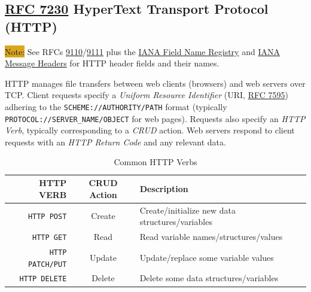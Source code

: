\documentclass[12pt]{article}
\newcommand{\note}[1]{\colorbox{#1}{Note:}}
\newcommand{\rfc}[1]{\href{https://datatracker.ietf.org/doc/html/rfc#1}{#1}}
\newcommand{\RFC}[1]{\href{https://datatracker.ietf.org/doc/html/rfc#1}{RFC #1}}
\begin{document}
	\subsection{\RFC{7230} HyperText Transport Protocol (HTTP) \label{subsec:HTTP}}
	\note{Goldenrod} See RFCs \rfc{9110}/\rfc{9111} plus the \href{https://www.iana.org/assignments/http-fields/http-fields.xhtml#field-names}{IANA Field Name Registry} and \href{https://www.iana.org/assignments/message-headers/message-headers.xml#perm-headers}{IANA Message Headers} for HTTP header fields and their names.

	HTTP manages file transfers between web clients (browsers) and web servers over TCP. Client requests specify a \textit{Uniform Resource Identifier} (URI, \RFC{7595}) adhering to the \texttt{SCHEME://AUTHORITY/PATH} format (typically \texttt{PROTOCOL://SERVER\_NAME/OBJECT} for web pages). Requests also specify an \textit{HTTP Verb}, typically corresponding to a \textit{CRUD} action. Web servers respond to client requests with an \textit{HTTP Return Code} and any relevant data.

	\begin{table}[H]
	\centering
	\caption{Common HTTP Verbs \label{tab:HTTP Verbs}}
	\begin{tabular}{r | c | l}
	\hline
	\textbf{HTTP VERB}		& \textbf{CRUD Action}	& \textbf{Description}\\\hline
	\texttt{HTTP POST}		& Create			& Create/initialize new data structures/variables\\\hline
	\texttt{HTTP GET}			& Read			& Read variable names/structures/values\\\hline
	\texttt{HTTP PATCH/PUT}	& Update			& Update/replace some variable values\\\hline
	\texttt{HTTP DELETE}		& Delete			& Delete some data structures/variables\\\hline
	\end{tabular}\end{table}
\end{document}
